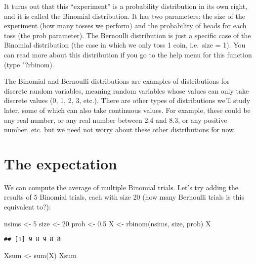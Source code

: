 \documentclass[
]{book}
\newenvironment{Shaded}{\begin{snugshade}}{\end{snugshade}}
\newcommand{\DecValTok}[1]{\textcolor[rgb]{0.00,0.00,0.81}{#1}}
\newcommand{\FloatTok}[1]{\textcolor[rgb]{0.00,0.00,0.81}{#1}}
\newcommand{\FunctionTok}[1]{\textcolor[rgb]{0.00,0.00,0.00}{#1}}
\newcommand{\NormalTok}[1]{#1}
\newcommand{\OtherTok}[1]{\textcolor[rgb]{0.56,0.35,0.01}{#1}}
\begin{document}
It turns out that this ``experiment'' is a probability distribution in its own right, and it is called the Binomial distribution. It has two parameters: the size of the experiment (how many tosses we perform) and the probability of heads for each toss (the prob parameter). The Bernoulli distribution is just a specific case of the Binomial distribution (the case in which we only toss 1 coin, i.e.~size = 1). You can read more about this distribution if you go to the help menu for this function (type "?rbinom).

The Binomial and Bernoulli distributions are examples of distributions for discrete random variables, meaning random variables whose values can only take discrete values (0, 1, 2, 3, etc.). There are other types of distributions we'll study later, some of which can also take continuous values. For example, these could be any real number, or any real number between 2.4 and 8.3, or any positive number, etc. but we need not worry about these other distributions for now.

\hypertarget{the-expectation}{%
\section{The expectation}\label{the-expectation}}

We can compute the average of multiple Binomial trials. Let's try adding the results of 5 Binomial trials, each with size 20 (how many Bernoulli trials is this equivalent to?):

\begin{Shaded}
\begin{Highlighting}[]
\NormalTok{nsims }\OtherTok{\textless{}{-}} \DecValTok{5}
\NormalTok{size }\OtherTok{\textless{}{-}} \DecValTok{20}
\NormalTok{prob }\OtherTok{\textless{}{-}} \FloatTok{0.5}
\NormalTok{X }\OtherTok{\textless{}{-}} \FunctionTok{rbinom}\NormalTok{(nsims, size, prob)}
\NormalTok{X}
\end{Highlighting}
\end{Shaded}

\begin{verbatim}
## [1] 9 8 9 8 8
\end{verbatim}

\begin{Shaded}
\begin{Highlighting}[]
\NormalTok{Xsum }\OtherTok{\textless{}{-}} \FunctionTok{sum}\NormalTok{(X)}
\NormalTok{Xsum}
\end{Highlighting}
\end{Shaded}
\end{document}
